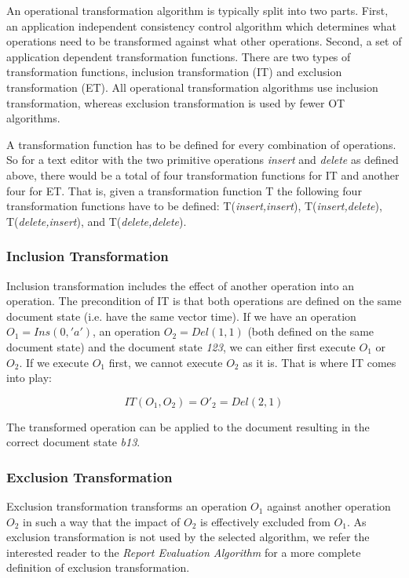 An operational transformation algorithm is typically split into two parts. 
First, an application independent consistency control algorithm which determines 
what operations need to be transformed against what other operations. Second,
a set of application dependent transformation functions. There are two
types of transformation functions, inclusion transformation (IT) and 
exclusion transformation (ET). All operational transformation algorithms
use inclusion transformation, whereas exclusion transformation is used
by fewer OT algorithms.

A transformation function has to be defined for every combination of operations.
So for a text editor with the two primitive operations \emph{insert} and
\emph{delete} as defined above, there would be a total of four transformation
functions for IT and another four for ET. That is, given a transformation
function T the following four transformation functions have to be defined:
T(\emph{insert,insert}), T(\emph{insert,delete}), T(\emph{delete,insert}), 
and T(\emph{delete,delete}).

\subsubsection{Inclusion Transformation}
Inclusion transformation includes the effect of another operation into an
operation. The precondition of IT is that both operations are defined on the
same document state (i.e. have the same vector time). If we have an operation
$O_1 = Ins(0,'a')$, an operation $O_2 = Del(1,1)$ (both defined on the same
document state) and the document state \emph{123}, we can either first
execute $O_1$ or $O_2$. If we execute $O_1$ first, we cannot execute $O_2$
as it is. That is where IT comes into play:

$$ IT(O_1,O_2) = O'_2 = Del(2,1) $$

The transformed operation can be applied to the document resulting in the
correct document state \emph{b13}.

\subsubsection{Exclusion Transformation}
Exclusion transformation transforms an operation $O_1$ against another operation
$O_2$ in such a way that the impact of $O_2$ is effectively excluded from
$O_1$. As exclusion transformation is not used by the selected algorithm, we
refer the interested reader to the \emph{Report Evaluation Algorithm} for
a more complete definition of exclusion transformation.


